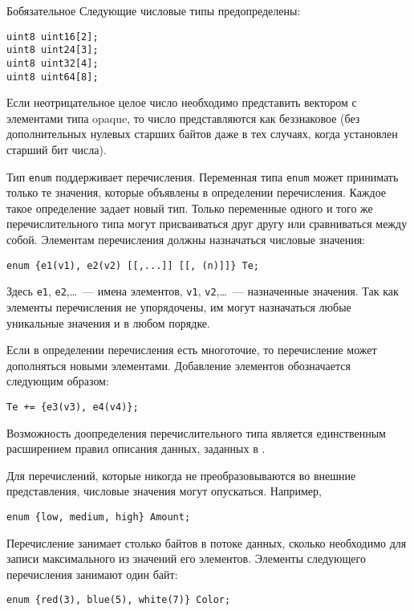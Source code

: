 \begin{appendix}{Б}{обязательное}
Следующие числовые типы предопределены:
\begin{lstlisting}
uint8 uint16[2];
uint8 uint24[3];
uint8 uint32[4];
uint8 uint64[8];
\end{lstlisting}

Если неотрицательное целое число необходимо представить вектором с 
элементами типа opaque, то число представляются как беззнаковое (без 
дополнительных нулевых старших байтов даже в тех случаях, когда установлен 
старший бит числа). 

\label{SYNTAX.5}

Тип \lstinline{enum} поддерживает перечисления. Переменная типа \lstinline{enum} 
может принимать только те значения, которые объявлены в определении 
перечисления. Каждое такое определение задает новый тип. Только переменные 
одного и того же перечислительного типа могут присваиваться друг другу или 
сравниваться между собой. Элементам перечисления должны назначаться числовые 
значения:
\begin{lstlisting}
enum {e1(v1), e2(v2) [[,...]] [[, (n)]]} Te;
\end{lstlisting}

Здесь \lstinline{e1}, \lstinline{e2},\ldots~--- имена элементов, 
\lstinline{v1}, \lstinline{v2},\ldots~--- назначенные значения. Так как 
элементы перечисления не упорядочены, им могут назначаться любые 
уникальные значения и в любом порядке. 

Если в определении перечисления есть многоточие, то перечисление может 
дополняться новыми элементами. Добавление элементов обозначается 
следующим образом: 
\begin{lstlisting}
Te += {e3(v3), e4(v4)};
\end{lstlisting}

\begin{note*}
Возможность доопределения перечислительного типа является 
единственным расширением правил описания данных, заданных в \cite{RFC5246}. 
\end{note*}

Для перечислений, которые никогда не преобразовываются во внешние 
представления, числовые значения могут опускаться. Например, 
\begin{lstlisting}
enum {low, medium, high} Amount;
\end{lstlisting}

Перечисление занимает столько байтов в потоке данных, сколько необходимо 
для записи максимального из значений его элементов. Элементы следующего 
перечисления занимают один байт:  
\begin{lstlisting}
enum {red(3), blue(5), white(7)} Color;
\end{lstlisting}


\end{appendix}
